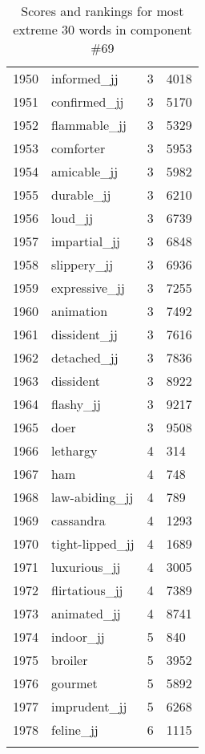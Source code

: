 \begin{longtable}[!htbp]{| rlr@{.}l |}
    1950 & informed\_jj & 3 & 4018 \\
    1951 & confirmed\_jj & 3 & 5170 \\
    1952 & flammable\_jj & 3 & 5329 \\
    1953 & comforter & 3 & 5953 \\
    1954 & amicable\_jj & 3 & 5982 \\
    1955 & durable\_jj & 3 & 6210 \\
    1956 & loud\_jj & 3 & 6739 \\
    1957 & impartial\_jj & 3 & 6848 \\
    1958 & slippery\_jj & 3 & 6936 \\
    1959 & expressive\_jj & 3 & 7255 \\
    1960 & animation & 3 & 7492 \\
    1961 & dissident\_jj & 3 & 7616 \\
    1962 & detached\_jj & 3 & 7836 \\
    1963 & dissident & 3 & 8922 \\
    1964 & flashy\_jj & 3 & 9217 \\
    1965 & doer & 3 & 9508 \\
    1966 & lethargy & 4 & 314 \\
    1967 & ham & 4 & 748 \\
    1968 & law-abiding\_jj & 4 & 789 \\
    1969 & cassandra & 4 & 1293 \\
    1970 & tight-lipped\_jj & 4 & 1689 \\
    1971 & luxurious\_jj & 4 & 3005 \\
    1972 & flirtatious\_jj & 4 & 7389 \\
    1973 & animated\_jj & 4 & 8741 \\
    1974 & indoor\_jj & 5 & 840 \\
    1975 & broiler & 5 & 3952 \\
    1976 & gourmet & 5 & 5892 \\
    1977 & imprudent\_jj & 5 & 6268 \\
    1978 & feline\_jj & 6 & 1115 \\
    \hline
    \caption{Scores and rankings for most extreme 30 words in component \#69} \\
\end{longtable}
